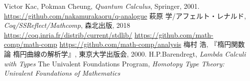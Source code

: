 \documentclass[11pt]{jsreport}
\theoremstyle{mystyle}
\newcommand{\0}{\textbf{0}}
\newcommand{\1}{\textbf{1}}
\newcommand{\2}{\textbf{2}}
\begin{document}
\begin{thebibliography}{9}
   Victor Kac, Pokman Cheung, {\it{Quantum Calculus}}, Springer, 2001.
   \url{https://github.com/nakamurakaoru/q-analogue}
   萩原 学/アフェルト・レナルド, {\it Coq/SSReflect/Mathcomp}, 森北出版, 
    2018
   \url{https://coq.inria.fr/distrib/current/stdlib/}
   \url{https://github.com/math-comp/math-comp}
   \url{https://github.com/math-comp/analysis}
   梅村 浩, 『楕円関数論  楕円曲線の解析学』, 東京大学出版会, 2000.
   H.P.Barendregt, {\it{Lambda Calculi with Types}}
   The Univalent Foundations Program, 
                      {\it{Homotopy Type Theory: Univalent Foundations of Mathematics}}

\end{thebibliography}
\end{document}
